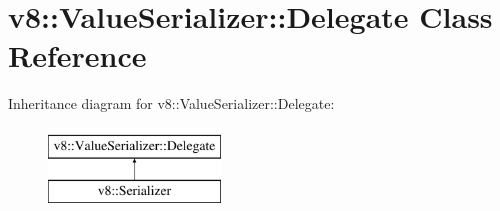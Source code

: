 \hypertarget{classv8_1_1ValueSerializer_1_1Delegate}{}\section{v8\+:\+:Value\+Serializer\+:\+:Delegate Class Reference}
\label{classv8_1_1ValueSerializer_1_1Delegate}
Inheritance diagram for v8\+:\+:Value\+Serializer\+:\+:Delegate\+:\begin{figure}[H]
\begin{center}
\leavevmode
\includegraphics[height=2.000000cm]{classv8_1_1ValueSerializer_1_1Delegate}
\end{center}
\end{figure}

